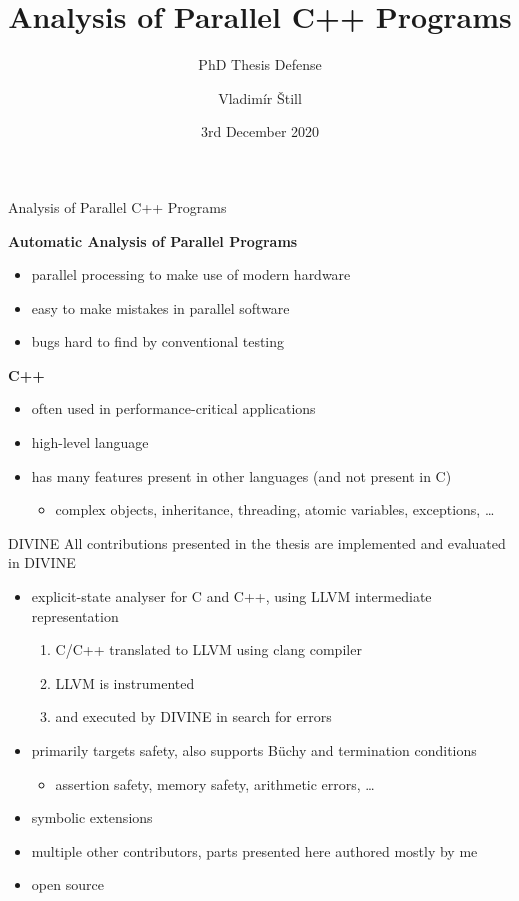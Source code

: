 \documentclass[aspectratio=169, fi]{paradise-slide}
\title{Analysis of Parallel C++ Programs}
\subtitle{PhD Thesis Defense}
\author{Vladimír Štill}
\date{3rd December 2020}
\begin{document}

\begin{frame}{Analysis of Parallel C++ Programs}

\textbf{Automatic Analysis of Parallel Programs}
\begin{itemize}
    \item parallel processing to make use of modern hardware
    \item easy to make mistakes in parallel software
    \item bugs hard to find by conventional testing
\end{itemize}
\pause

\bigskip
\textbf{C++}
\begin{itemize}
  \item often used in performance-critical applications
  \item high-level language
  \item has many features present in other languages (and not present in C)
    \pause
    \begin{itemize}
      \item complex objects, inheritance, threading, atomic variables, exceptions, …
    \end{itemize}
\end{itemize}
\end{frame}

\begin{frame}{DIVINE}
  All contributions presented in the thesis are implemented and evaluated in DIVINE

  \begin{itemize}
    \item explicit-state analyser for C and C++, using LLVM intermediate representation
      \begin{enumerate}
        \item C/C++ translated to LLVM using clang compiler
        \item LLVM is instrumented
        \item and executed by DIVINE in search for errors
      \end{enumerate}\pause
    \item primarily targets safety, also supports Büchy and termination conditions
      \begin{itemize}
        \item assertion safety, memory safety, arithmetic errors, …
      \end{itemize} \pause
    \item symbolic extensions \pause
    \item multiple other contributors, parts presented here authored mostly by me
    \item open source
  \end{itemize}
\end{frame}
\end{document}
